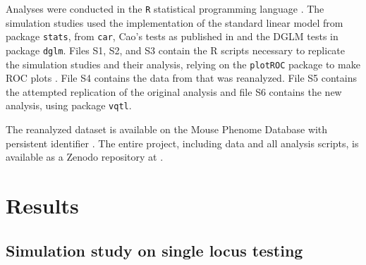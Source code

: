 Analyses were conducted in the \texttt{R} statistical programming language \citep{RCoreTeam2017}.
The simulation studies used the implementation of the standard linear model from package \texttt{stats}, \Lev from \texttt{car}, Cao's tests as published in \cite{Cao2014} and the DGLM tests in package \texttt{dglm}.
Files S1, S2, and S3 contain the R scripts necessary to replicate the simulation studies and their analysis, relying on the \texttt{plotROC} package to make ROC plots \citep{sachs2017plotroc}.
File S4 contains the data from \cite{Leamy2000} that was reanalyzed.
File S5 contains the attempted replication of the original analysis \citep{Yi2006} and file S6 contains the new analysis, using package \texttt{vqtl}.

The reanalyzed dataset is available on the Mouse Phenome Database \citep{Grubb2014a} with persistent identifier \mpdidentifier.
The entire project, including data and all analysis scripts, is available as a Zenodo repository at \zenodourl.




\section{Results}

\subsection{Simulation study on single locus testing}

